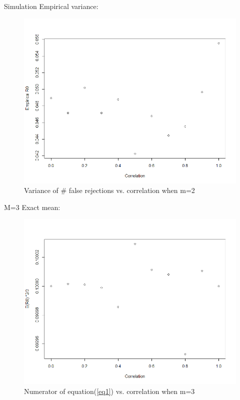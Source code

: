 \documentclass{beamer}
\begin{document}
\begin{frame}[t]{Simulation}\vspace{10pt}
Empirical variance:
\begin{figure}[h]
	\centering
	\includegraphics[scale=0.35]{empirical_m=2_var}
	\caption{\footnotesize{Variance of \# false rejections vs. correlation when m=2}}
	\label{fig4}
\end{figure}
\end{frame}


\begin{frame}[t]{M=3}\vspace{10pt}
Exact mean:
\begin{figure}[h]
	\centering
	\includegraphics[scale=0.35]{exact_m=3}
	\caption{\footnotesize{Numerator of equation(\ref{eq1}) vs. correlation when m=3}}
	\label{fig5}
\end{figure}
\end{frame}
\end{document}
